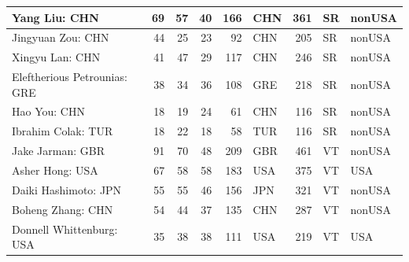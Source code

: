\documentclass[
  10.5pt,
  letterpaper,
  DIV=11,
  numbers=noendperiod]{scrartcl}
\begin{document}
\begin{table}[H]
\begin{tabular}[t]{l|r|r|r|r|l|r|l|l}
\hline
Yang Liu: CHN & 69 & 57 & 40 & 166 & CHN & 361 & SR & nonUSA\\
\hline
Jingyuan Zou: CHN & 44 & 25 & 23 & 92 & CHN & 205 & SR & nonUSA\\
\hline
Xingyu Lan: CHN & 41 & 47 & 29 & 117 & CHN & 246 & SR & nonUSA\\
\hline
Eleftherious Petrounias: GRE & 38 & 34 & 36 & 108 & GRE & 218 & SR & nonUSA\\
\hline
Hao You: CHN & 18 & 19 & 24 & 61 & CHN & 116 & SR & nonUSA\\
\hline
Ibrahim Colak: TUR & 18 & 22 & 18 & 58 & TUR & 116 & SR & nonUSA\\
\hline
Jake Jarman: GBR & 91 & 70 & 48 & 209 & GBR & 461 & VT & nonUSA\\
\hline
Asher Hong: USA & 67 & 58 & 58 & 183 & USA & 375 & VT & USA\\
\hline
Daiki Hashimoto: JPN & 55 & 55 & 46 & 156 & JPN & 321 & VT & nonUSA\\
\hline
Boheng Zhang: CHN & 54 & 44 & 37 & 135 & CHN & 287 & VT & nonUSA\\
\hline
Donnell Whittenburg: USA & 35 & 38 & 38 & 111 & USA & 219 & VT & USA\\
\hline
\end{tabular}
\end{table}
\end{document}
